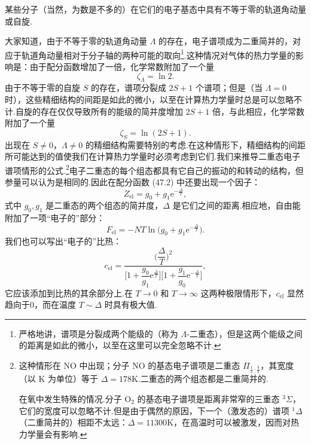 某些分子（当然，为数是不多的）在它们的电子基态中具有不等于零的轨道角动量或自旋.

大家知道，由于不等于零的轨道角动量 $\Lambda$ 的存在，电子谱项成为二重简并的，对应于轨道角动量相对于分子轴的两种可能的取向\footnote{严格地讲，谱项是分裂成两个能级的（称为 $\Lambda$-二重态），但是这两个能级之间的距离是如此的微小，以至在这里可以完全忽略不计.}.这种情况对气体的热力学量的影响是：由于配分函数增加了一倍，化学常数附加了一个量
\begin{equation}
  \zeta_{\Lambda}=\ln2.
\end{equation}
由于不等于零的自旋 $S$ 的存在，谱项分裂成 $2S+1$ 个谱项；但是（当 $\Lambda=0$ 时），这些精细结构的间距是如此的微小，以至在计算热力学量时总是可以忽略不计.自旋的存在仅仅导致所有的能级的简并度增加 $2S+1$ 倍，与此相应，化学常数附加了一个量
\begin{equation}
  \zeta_S=\ln\left(2S+1\right).
\end{equation}
出现在 $S\neq0$，$\Lambda\neq0$ 的精细结构需要特别的考虑.在这种情形下，精细结构的间距所可能达到的值使我们在计算热力学量时必须考虑到它们.我们来推导二重态电子谱项情形的公式.\footnote{这种情形在 NO 中出现；分子 NO 的基态电子谱项是二重态 $\Pi_{\frac{1}{2}\cdot\frac{3}{2}}$，其宽度（以 K 为单位）等于 $\Delta=178$K.二重态的两个组态都是二重简并的.\par
在氧中发生特殊的情况.分子 $\mathrm{O}_2$ 的基态电子谱项是距离非常窄的三重态 $^3\Sigma$，它们的宽度可以忽略不计.但是由于偶然的原因，下一个（激发态的）谱项 $^1\Delta$（二重简并的）相距不太远：$\Delta=11300$K，在高温时可以被激发，因而对热力学量会有影响.}电子二重态的每个组态都具有它自己的振动的和转动的结构，但参量可以认为是相同的.因此在配分函数 (47.2) 中还要出现一个因子：
\begin{equation*}
  Z_{\mathrm{el}}=g_0+g_1\mathrm{e}^{-\frac{\Delta}{T}},
\end{equation*}
式中 $g_0,g_1$ 是二重态的两个组态的简并度，$\Delta$ 是它们之间的距离.相应地，自由能附加了一项“电子的”部分：
\begin{equation}
  F_{\mathrm{el}}=-NT\ln\Big(g_0+g_1\mathrm{e}^{-\frac{\Delta}{T}}\Big).
\end{equation}
我们也可以写出“电子的”比热：
\begin{equation}
  c_{\mathrm{el}}=\frac{\Big(\dfrac{\Delta}{T}\Big)^{2}}
  {\Big[1+\dfrac{g_0}{g_1}\mathrm{e}^{\frac{\Delta}{T}}\Big]
  \Big[1+\dfrac{g_1}{g_0}\mathrm{e}^{-\frac{\Delta}{T}}\Big]},
\end{equation}
它应该添加到比热的其余部分上.在 $T\to0$ 和 $T\to\infty$ 这两种极限情形下，$c_{\mathrm{el}}$ 显然趋向于0，而在温度 $T\sim\Delta$ 时具有极大值.

